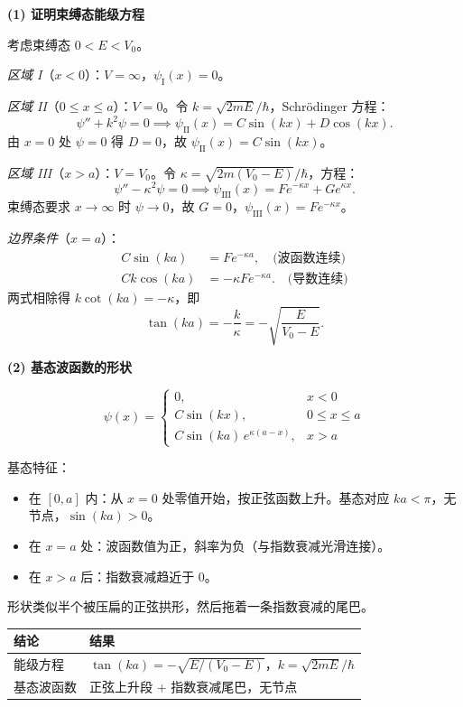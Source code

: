 \begin{derivationbox}[标准解题过程]
\textbf{(1) 证明束缚态能级方程}

考虑束缚态 $0<E<V_0$。

\textit{区域 I}（$x<0$）：$V=\infty$，$\psi_{\text{I}}(x)=0$。

\textit{区域 II}（$0\leq x\leq a$）：$V=0$。令 $k=\sqrt{2mE}/\hbar$，Schrödinger 方程：
\[
\psi''+k^2\psi=0\implies\psi_{\text{II}}(x)=C\sin(kx)+D\cos(kx).
\]
由 $x=0$ 处 $\psi=0$ 得 $D=0$，故 $\psi_{\text{II}}(x)=C\sin(kx)$。

\textit{区域 III}（$x>a$）：$V=V_0$。令 $\kappa=\sqrt{2m(V_0-E)}/\hbar$，方程：
\[
\psi''-\kappa^2\psi=0\implies\psi_{\text{III}}(x)=Fe^{-\kappa x}+Ge^{\kappa x}.
\]
束缚态要求 $x\to\infty$ 时 $\psi\to0$，故 $G=0$，$\psi_{\text{III}}(x)=Fe^{-\kappa x}$。

\textit{边界条件}（$x=a$）：
\begin{align*}
C\sin(ka)&=Fe^{-\kappa a},\quad\text{(波函数连续)}\\
Ck\cos(ka)&=-\kappa Fe^{-\kappa a}.\quad\text{(导数连续)}
\end{align*}
两式相除得 $k\cot(ka)=-\kappa$，即
\begin{equation}
\boxed{\tan(ka)=-\frac{k}{\kappa}=-\sqrt{\frac{E}{V_0-E}}.}
\end{equation}

\textbf{(2) 基态波函数的形状}

\[
\psi(x)=\begin{cases}0,&x<0\\C\sin(kx),&0\leq x\leq a\\C\sin(ka)\,e^{\kappa(a-x)},&x>a\end{cases}
\]

基态特征：
\begin{itemize}
    \item 在 $[0,a]$ 内：从 $x=0$ 处零值开始，按正弦函数上升。基态对应 $ka<\pi$，无节点，$\sin(ka)>0$。
    \item 在 $x=a$ 处：波函数值为正，斜率为负（与指数衰减光滑连接）。
    \item 在 $x>a$ 后：指数衰减趋近于 0。
\end{itemize}

形状类似半个被压扁的正弦拱形，然后拖着一条指数衰减的尾巴。
\end{derivationbox}

\begin{formulabox}[答案汇总]
\begin{center}
\begin{tabular}{ll}
\toprule
\textbf{结论} & \textbf{结果} \\
\midrule
能级方程 & $\tan(ka)=-\sqrt{E/(V_0-E)}$，$k=\sqrt{2mE}/\hbar$ \\
基态波函数 & 正弦上升段 + 指数衰减尾巴，无节点 \\
\bottomrule
\end{tabular}
\end{center}
\end{formulabox}

